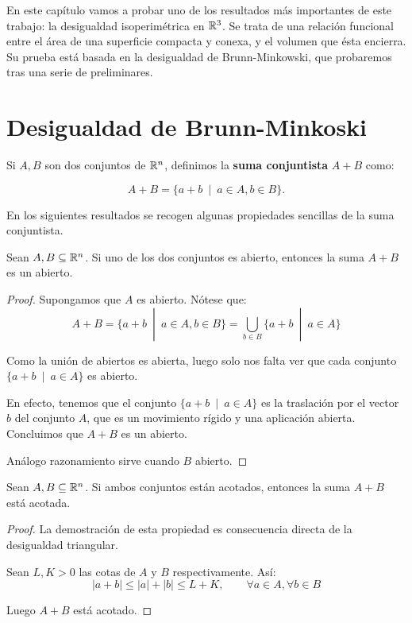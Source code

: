 \label{chapter:isoperimetricinequality}
En este capítulo vamos a probar uno de los resultados más importantes de este trabajo: la desigualdad isoperimétrica en $\mathbb{R}^3$. Se trata de una relación funcional entre el área de una superficie compacta y conexa, y el volumen que ésta encierra. Su prueba está basada en la desigualdad de Brunn-Minkowski, que probaremos tras una serie de preliminares.

\section{Desigualdad de Brunn-Minkoski}

\begin{definition}
Si $A, B$ son dos conjuntos de $\mathbb{R}^n$, definimos la \textbf{suma conjuntista} $A+B$ como:

\begin{equation*}
    A+B = \{a+b \enspace | \enspace a \in A, b \in B\}.
\end{equation*}
\end{definition}

En los siguientes resultados se recogen algunas propiedades sencillas de la suma conjuntista.

\begin{lemma}
Sean $A,B \subseteq \mathbb{R}^n$. Si uno de los dos conjuntos es abierto, entonces la suma $A+B$ es un abierto.
\end{lemma}
\begin{proof}
Supongamos que $A$ es abierto. Nótese que:
\begin{equation*}
    A + B = \{a+b \enspace | \enspace a \in A, b \in B\} = \displaystyle\bigcup_{b \in B} \{a+b \enspace | \enspace a \in A\}
\end{equation*}

Como la unión de abiertos es abierta, luego solo nos falta ver que cada conjunto $\{a+b \enspace | \enspace a \in A\}$ es abierto.

En efecto, tenemos que el conjunto $\{a+b \enspace | \enspace a \in A\}$ es la traslación por el vector $b$ del conjunto $A$, que es un movimiento rígido y una aplicación abierta. Concluimos que $A+B$ es un abierto.

Análogo razonamiento sirve cuando $B$ abierto.
\end{proof}


\begin{lemma}
Sean $A,B \subseteq \mathbb{R}^n$. Si ambos conjuntos están acotados, entonces la suma $A+B$ está acotada.
\end{lemma}
\begin{proof}
La demostración de esta propiedad es consecuencia directa de la desigualdad triangular.

Sean $L,K > 0$ las cotas de $A$ y $B$ respectivamente. Así:
\begin{equation*}
    |a+b| \leq |a|+|b| \leq L + K, \qquad \forall a \in A, \forall b\in B
\end{equation*}

Luego $A+B$ está acotado.
\end{proof}

